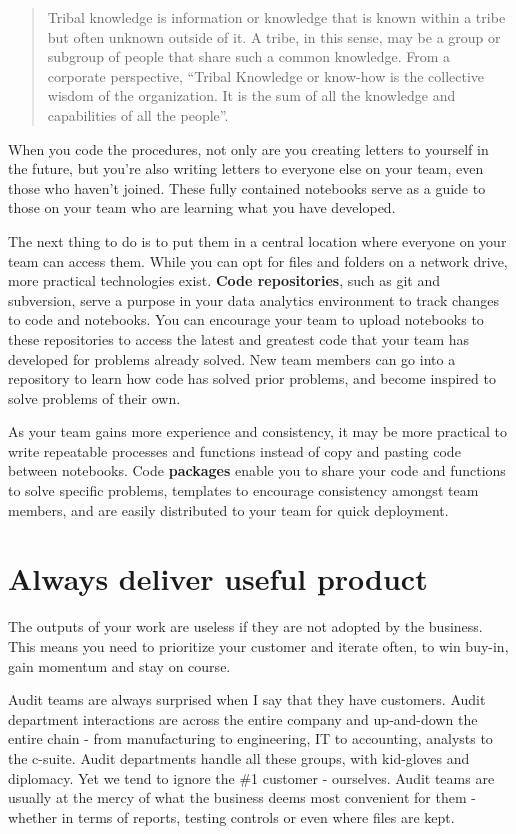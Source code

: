 \documentclass[
]{book}
\begin{document}
\begin{quote}
Tribal knowledge is information or knowledge that is known within a tribe but often unknown outside of it. A tribe, in this sense, may be a group or subgroup of people that share such a common knowledge. From a corporate perspective, ``Tribal Knowledge or know-how is the collective wisdom of the organization. It is the sum of all the knowledge and capabilities of all the people''. \citep{tribal-knowledge}
\end{quote}

When you code the procedures, not only are you creating letters to yourself in the future, but you're also writing letters to everyone else on your team, even those who haven't joined. These fully contained notebooks serve as a guide to those on your team who are learning what you have developed.

The next thing to do is to put them in a central location where everyone on your team can access them. While you can opt for files and folders on a network drive, more practical technologies exist. \textbf{Code repositories}, such as git and subversion, serve a purpose in your data analytics environment to track changes to code and notebooks. You can encourage your team to upload notebooks to these repositories to access the latest and greatest code that your team has developed for problems already solved. New team members can go into a repository to learn how code has solved prior problems, and become inspired to solve problems of their own.

As your team gains more experience and consistency, it may be more practical to write repeatable processes and functions instead of copy and pasting code between notebooks. Code \textbf{packages} enable you to share your code and functions to solve specific problems, templates to encourage consistency amongst team members, and are easily distributed to your team for quick deployment.

\hypertarget{always-deliver-useful-product}{%
\section{Always deliver useful product}\label{always-deliver-useful-product}}

The outputs of your work are useless if they are not adopted by the business. This means you need to prioritize your customer and iterate often, to win buy-in, gain momentum and stay on course.

Audit teams are always surprised when I say that they have customers. Audit department interactions are across the entire company and up-and-down the entire chain - from manufacturing to engineering, IT to accounting, analysts to the c-suite. Audit departments handle all these groups, with kid-gloves and diplomacy. Yet we tend to ignore the \#1 customer - ourselves. Audit teams are usually at the mercy of what the business deems most convenient for them - whether in terms of reports, testing controls or even where files are kept.
\end{document}
